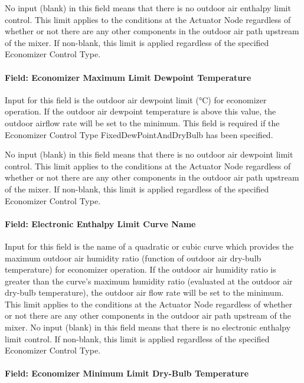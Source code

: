 No input (blank) in this field means that there is no outdoor air enthalpy limit control. This limit applies to the conditions at the Actuator Node regardless of whether or not there are any other components in the outdoor air path upstream of the mixer. If non-blank, this limit is applied regardless of the specified Economizer Control Type.

\paragraph{Field: Economizer Maximum Limit Dewpoint Temperature}\label{field-economizer-maximum-limit-dewpoint-temperature}

Input for this field is the outdoor air dewpoint limit (°C) for economizer operation. If the outdoor air dewpoint temperature is above this value, the outdoor airflow rate will be set to the minimum. This field is required if the Economizer Control Type FixedDewPointAndDryBulb has been specified.

No input (blank) in this field means that there is no outdoor air dewpoint limit control. This limit applies to the conditions at the Actuator Node regardless of whether or not there are any other components in the outdoor air path upstream of the mixer. If non-blank, this limit is applied regardless of the specified Economizer Control Type.

\paragraph{Field: Electronic Enthalpy Limit Curve Name}\label{field-electronic-enthalpy-limit-curve-name}

Input for this field is the name of a quadratic or cubic curve which provides the maximum outdoor air humidity ratio (function of outdoor air dry-bulb temperature) for economizer operation. If the outdoor air humidity ratio is greater than the curve's maximum humidity ratio (evaluated at the outdoor air dry-bulb temperature), the outdoor air flow rate will be set to the minimum. This limit applies to the conditions at the Actuator Node regardless of whether or not there are any other components in the outdoor air path upstream of the mixer. No input (blank) in this field means that there is no electronic enthalpy limit control. If non-blank, this limit is applied regardless of the specified Economizer Control Type.

\paragraph{Field: Economizer Minimum Limit Dry-Bulb Temperature}\label{field-economizer-minimum-limit-dry-bulb-temperature}

